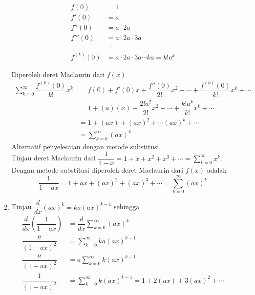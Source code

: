 \documentclass{article}
\begin{document}
\begin{enumerate}
\begin{enumerate}
\begin{multicols}{2}
\begin{align*}
		f(0) &= 1\\
		f'(0) &= a\\
		f''(0) &= a\cdot 2a\\
		f'''(0) &= a\cdot 2a\cdot 3a\\
		&~~\vdots\\
		f^{(k)}(0) &= a\cdot 2a\cdot 3a\cdots ka=k!a^k
		\end{align*}
		\end{multicols}
		Diperoleh deret Maclaurin dari $f(x)$
		\begin{align*}
		\sum_{k=0}^\infty \dfrac{f^{(k)}(0)}{k!}x^k &= f(0) + f'(0)x +\dfrac{f''(0)}{2!}x^2+\cdots+\dfrac{f^{(k)}(0)}{k!}x^k+\cdots\\
		&= 1+(a)(x)+\dfrac{2!a^2}{2!}x^2+\cdots+\dfrac{k!a^k}{k!}x^k+\cdots\\
		&= 1+(ax)+(ax)^2+\cdots (ax)^k+\cdots\\
		&= \sum_{k=0}^\infty (ax)^k
\end{align*}				 
		Alternatif penyelesaian dengan metode substitusi.\\
		Tinjau deret Maclaurin dari $\displaystyle \dfrac{1}{1-x}=1+x+x^2+x^3+\cdots=\sum_{k=0}^\infty x^k$. Dengan metode substitusi diperoleh deret Maclaurin dari $f(x)$ adalah 
		$$ \dfrac{1}{1-ax}=1+ax+(ax)^2+(ax)^3+\cdots =\sum_{k=0}^\infty (ax)^k$$
		\item Tinjau $\dfrac{d}{dx}(ax)^k=ka(ax)^{k-1}$ sehingga
	\begin{align*}
	\dfrac{d}{dx} \left(\dfrac{1}{1-ax}\right) &= \dfrac{d}{dx} \sum_{k=0}^\infty (ax)^k\\
	\dfrac{a}{(1-ax)^2} &= \sum_{k=0}^\infty ka(ax)^{k-1}\\
	\dfrac{a}{(1-ax)^2} &= a\sum_{k=0}^\infty k(ax)^{k-1}\\
	\dfrac{1}{(1-ax)^2} &= \sum_{k=0}^\infty k(ax)^{k-1} = 1+2(ax)+3(ax)^2+\cdots 
	\end{align*}
	\end{enumerate}
\end{enumerate}
\end{document}
